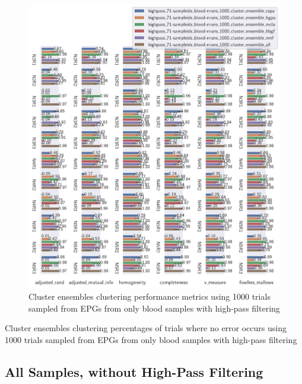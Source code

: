 \begin{theappendices}
\begin{figure}[H]
\centering
\includegraphics[width=\textwidth]{./figures/clust_comparison/highpass_71-sampleids_blood-nruns_1000_cluster_ensembles.pdf}
\caption{Cluster ensembles clustering performance metrics using 1000 trials sampled from EPGs from only blood samples with high-pass filtering}
\label{fig:highpass_71-sampleids_blood-nruns_1000_cluster_ensembles}
\end{figure}

\begin{table}[H]
\centering
{}
\caption{Cluster ensembles clustering percentages of trials where no error occurs using 1000 trials sampled from EPGs from only blood samples with high-pass filtering}
\label{table:highpass_71-sampleids_blood-nruns_1000_cluster_ensembles}
\end{table}

\subsection{All Samples, without High-Pass Filtering}


\end{theappendices}

